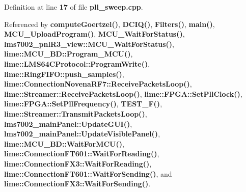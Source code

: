 Definition at line {\bf 17} of file {\bf pll\+\_\+sweep.\+cpp}.



Referenced by {\bf compute\+Goertzel()}, {\bf D\+C\+I\+Q()}, {\bf Filters()}, {\bf main()}, {\bf M\+C\+U\+\_\+\+Upload\+Program()}, {\bf M\+C\+U\+\_\+\+Wait\+For\+Status()}, {\bf lms7002\+\_\+pnl\+R3\+\_\+view\+::\+M\+C\+U\+\_\+\+Wait\+For\+Status()}, {\bf lime\+::\+M\+C\+U\+\_\+\+B\+D\+::\+Program\+\_\+\+M\+C\+U()}, {\bf lime\+::\+L\+M\+S64\+C\+Protocol\+::\+Program\+Write()}, {\bf lime\+::\+Ring\+F\+I\+F\+O\+::push\+\_\+samples()}, {\bf lime\+::\+Connection\+Novena\+R\+F7\+::\+Receive\+Packets\+Loop()}, {\bf lime\+::\+Streamer\+::\+Receive\+Packets\+Loop()}, {\bf lime\+::\+F\+P\+G\+A\+::\+Set\+Pll\+Clock()}, {\bf lime\+::\+F\+P\+G\+A\+::\+Set\+Pll\+Frequency()}, {\bf T\+E\+S\+T\+\_\+\+F()}, {\bf lime\+::\+Streamer\+::\+Transmit\+Packets\+Loop()}, {\bf lms7002\+\_\+main\+Panel\+::\+Update\+G\+U\+I()}, {\bf lms7002\+\_\+main\+Panel\+::\+Update\+Visible\+Panel()}, {\bf lime\+::\+M\+C\+U\+\_\+\+B\+D\+::\+Wait\+For\+M\+C\+U()}, {\bf lime\+::\+Connection\+F\+T601\+::\+Wait\+For\+Reading()}, {\bf lime\+::\+Connection\+F\+X3\+::\+Wait\+For\+Reading()}, {\bf lime\+::\+Connection\+F\+T601\+::\+Wait\+For\+Sending()}, and {\bf lime\+::\+Connection\+F\+X3\+::\+Wait\+For\+Sending()}.

